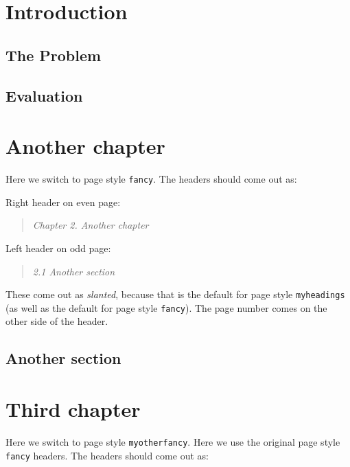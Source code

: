\documentclass{book}
\begin{document}
\tableofcontents

\chapter{Introduction}
\thispagestyle{headings}
\lipsum[1]

\section{The Problem}
\label{sec:problem}

\lipsum[2-3]

\section{Evaluation}

\lipsum[3-5]

\newpage
\pagestyle{fancy}
\chapter{Another chapter}

Here we switch to page style \texttt{fancy}. The headers should come out as:

Right header on even page:
\begin{quote}
  \textsl{Chapter 2. Another chapter}
\end{quote}
Left header on odd page:
\begin{quote}
  \textsl{2.1 Another section}
\end{quote}
These come out as \textsl{slanted}, because that is the default for page style \texttt{myheadings} (as well as the default for page style \texttt{fancy}).
The page number comes on the other side of the header.

\lipsum[1]

\section{Another section}

\lipsum

\newpage
\pagestyle{myotherfancy}
\chapter{Third chapter}

Here we switch to page style \texttt{myotherfancy}. Here we use the original page style \texttt{fancy} headers. The headers should come out as:
\end{document}
